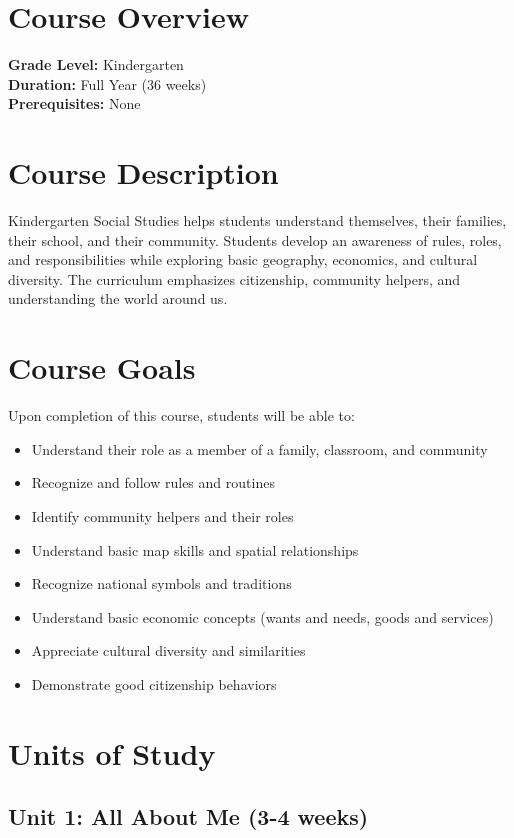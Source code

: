\documentclass[11pt,letterpaper]{report}
\begin{document}
\section{Course Overview}

\textbf{Grade Level:} Kindergarten\\
\textbf{Duration:} Full Year (36 weeks)\\
\textbf{Prerequisites:} None

\section{Course Description}

Kindergarten Social Studies helps students understand themselves, their families, their school, and their community. Students develop an awareness of rules, roles, and responsibilities while exploring basic geography, economics, and cultural diversity. The curriculum emphasizes citizenship, community helpers, and understanding the world around us.

\section{Course Goals}

Upon completion of this course, students will be able to:

\begin{itemize}
    \item Understand their role as a member of a family, classroom, and community
    \item Recognize and follow rules and routines
    \item Identify community helpers and their roles
    \item Understand basic map skills and spatial relationships
    \item Recognize national symbols and traditions
    \item Understand basic economic concepts (wants and needs, goods and services)
    \item Appreciate cultural diversity and similarities
    \item Demonstrate good citizenship behaviors
\end{itemize}

\section{Units of Study}

\subsection{Unit 1: All About Me (3-4 weeks)}
\end{document}

